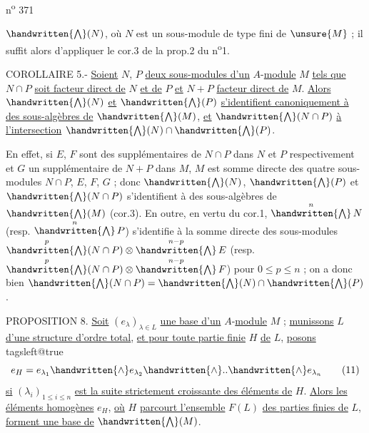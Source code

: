n\textsuperscript{o} 371

$\handwritten{\bigwedge}(N)$, où $N$ est un sous-module de type fini de $\unsure{M}$ ; il suffit alors d'appliquer le cor.3 de la prop.2 du n\textsuperscript{o}1.

COROLLAIRE 5.- \uline{Soient} $N$, $P$ \uline{deux sous-modules d'un} $A$-\uline{module} $M$ \uline{tels que} $N\cap P$ \uline{soit facteur direct de} $N$ \uline{et de} $P$ \uline{et} $N+P$ \uline{facteur direct de} $M$. \uline{Alors} $\handwritten{\bigwedge}(N)$ \uline{et} $\handwritten{\bigwedge}(P)$ \uline{s'identifient canoniquement à des sous-algèbres de} $\handwritten{\bigwedge}(M)$, \uline{et} $\handwritten{\bigwedge}(N\cap P)$ \uline{à l'intersection} $\handwritten{\bigwedge}(N)\cap \handwritten{\bigwedge}(P)$.

En effet, si $E$, $F$ sont des supplémentaires de $N\cap P$ dans $N$ et $P$ respectivement et $G$ un supplémentaire de $N+P$ dans $M$, $M$ est somme directe des quatre sous-modules $N\cap P$, $E$, $F$, $G$ ; donc $\handwritten{\bigwedge}(N)$, $\handwritten{\bigwedge}(P)$ et $\handwritten{\bigwedge}(N\cap P)$ s'identifient à des sous-algèbres de $\handwritten{\bigwedge}(M)$ (cor.3). En outre, en vertu du cor.1, $\overset{n}{\handwritten{\bigwedge}}\,N$ (resp. $\overset{n}{\handwritten{\bigwedge}}\,P$) s'identifie à la somme directe des sous-modules $\overset{p}{\handwritten{\bigwedge}}(N\cap P)\otimes\overset{n-p}{\handwritten{\bigwedge}}\,E$ (resp. $\overset{p}{\handwritten{\bigwedge}}(N\cap P)\otimes\overset{n-p}{\handwritten{\bigwedge}}\,F$) pour $0\leq p\leq n$ ; on a donc bien $\handwritten{\bigwedge}(N\cap P)=\handwritten{\bigwedge}(N)\cap \handwritten{\bigwedge}(P)$.

PROPOSITION 8.\unsure{=|-} \uline{Soit} $(e_{\lambda})_{\lambda\in L}$ \uline{une base d'un} $A$-\uline{module} $M$ ; \uline{munissons} $L$ \uline{d'une structure d'ordre total}, \uline{et pour toute partie finie} $H$ \uline{de} $L$, \uline{posons}
\begingroup\csname tagsleft@true\endcsname
\[
 e_H=e_{\lambda_1}\handwritten{\wedge} e_{\lambda_2}\handwritten{\wedge}\mathord{..}\handwritten{\wedge} e_{\lambda_n}\tag*{(11)}
\]
\endgroup
\uline{si} $(\lambda_i)_{1\leq i\leq n}$ \uline{est la suite strictement croissante des éléments de} $H$. \uline{Alors les éléments homogènes} $e_H$, \uline{où} $H$ \uline{parcourt l'ensemble} $F(L)$ \uline{des parties finies de} $L$, \uline{forment une base de} $\handwritten{\bigwedge}(M)$.

